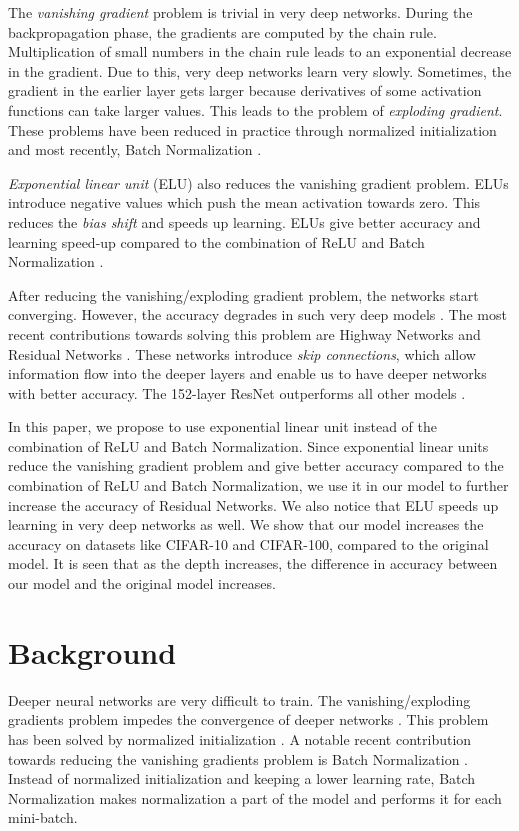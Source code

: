 \documentclass[10pt,twocolumn,letterpaper]{article}
\begin{document}
The \emph{vanishing gradient} problem is trivial in very deep networks. During the backpropagation phase, the gradients are computed by the chain rule. Multiplication of small numbers in the chain rule leads to an exponential decrease in the gradient. Due to this, very deep networks learn very slowly. Sometimes, the gradient in the earlier layer gets larger because derivatives of some activation functions can take larger values. This leads to the problem of \emph{exploding gradient}. These problems have been reduced in practice through normalized initialization \cite{[3]} and most recently, Batch Normalization \cite{[4]}.

\emph{Exponential linear unit} (ELU) \cite{[9]} also reduces the vanishing gradient problem. ELUs introduce negative values which push the mean activation towards zero. This reduces the \emph{bias shift} and speeds up learning. ELUs give better accuracy and learning speed-up compared to the combination of ReLU \cite{[8]} and Batch Normalization \cite{[4]}.

After reducing the vanishing/exploding gradient problem, the networks start converging. However, the accuracy degrades in such very deep models \cite{[1]}. The most recent contributions towards solving this problem are Highway Networks \cite{[7]} and Residual Networks \cite{[1]}. These networks introduce \emph{skip connections}, which allow information flow into the deeper layers and enable us to have deeper networks with better accuracy. The 152-layer ResNet outperforms all other models \cite{[1]}. 

In this paper, we propose to use exponential linear unit instead of the combination of ReLU and Batch Normalization. Since exponential linear units reduce the vanishing gradient problem and give better accuracy compared to the combination of ReLU and Batch Normalization, we use it in our model to further increase the accuracy of Residual Networks. We also notice that ELU speeds up learning in very deep networks as well. We show that our model increases the accuracy on datasets like CIFAR-10 and CIFAR-100, compared to the original model. It is seen that as the depth increases, the difference in accuracy between our model and the original model increases.


\section{Background}

Deeper neural networks are very difficult to train. The vanishing/exploding gradients problem impedes the convergence of deeper networks \cite{[3]}. This problem has been solved by normalized initialization \cite{[3], [5], [6]}. A notable recent contribution towards reducing the vanishing gradients problem is Batch Normalization \cite{[4]}. Instead of normalized initialization and keeping a lower learning rate, Batch Normalization makes normalization a part of the model and performs it for each mini-batch. 
\end{document}
